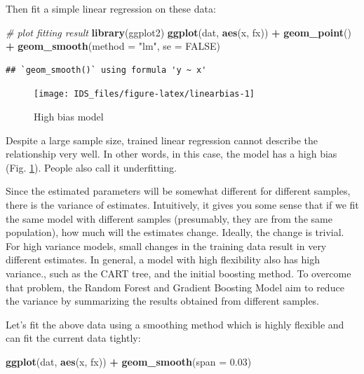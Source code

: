 \documentclass[12pt,]{krantz}
\makeatletter
\newenvironment{Shaded}{\begin{snugshade}}{\end{snugshade}}
\newcommand{\CommentTok}[1]{\textcolor[rgb]{0.37,0.37,0.37}{\textit{#1}}}
\newcommand{\DataTypeTok}[1]{\textcolor[rgb]{0.27,0.27,0.27}{#1}}
\newcommand{\FloatTok}[1]{\textcolor[rgb]{0.06,0.06,0.06}{#1}}
\newcommand{\KeywordTok}[1]{\textcolor[rgb]{0.27,0.27,0.27}{\textbf{#1}}}
\newcommand{\NormalTok}[1]{#1}
\newcommand{\OperatorTok}[1]{\textcolor[rgb]{0.43,0.43,0.43}{\textbf{#1}}}
\newcommand{\OtherTok}[1]{\textcolor[rgb]{0.37,0.37,0.37}{#1}}
\newcommand{\StringTok}[1]{\textcolor[rgb]{0.5,0.5,0.5}{#1}}
\newenvironment{kframe}{%
\medskip{}
\setlength{\fboxsep}{.8em}
 \def\at@end@of@kframe{}%
 \ifinner\ifhmode%
  \def\at@end@of@kframe{\end{minipage}}%
  \begin{minipage}{\columnwidth}%
 \fi\fi%
 \def\FrameCommand##1{\hskip\@totalleftmargin \hskip-\fboxsep
 \colorbox{shadecolor}{##1}\hskip-\fboxsep
     \hskip-\linewidth \hskip-\@totalleftmargin \hskip\columnwidth}%
 \MakeFramed {\advance\hsize-\width
   \@totalleftmargin\z@ \linewidth\hsize
   \@setminipage}}%
 {\par\unskip\endMakeFramed%
 \at@end@of@kframe}
\renewenvironment{Shaded}{\begin{kframe}}{\end{kframe}}
\makeatother
\begin{document}
Then fit a simple linear regression on these data:

\begin{Shaded}
\begin{Highlighting}[]
\CommentTok{# plot fitting result}
\KeywordTok{library}\NormalTok{(ggplot2)}
\KeywordTok{ggplot}\NormalTok{(dat, }\KeywordTok{aes}\NormalTok{(x, fx)) }\OperatorTok{+}\StringTok{ }
\StringTok{    }\KeywordTok{geom_point}\NormalTok{() }\OperatorTok{+}\StringTok{ }
\StringTok{    }\KeywordTok{geom_smooth}\NormalTok{(}\DataTypeTok{method =} \StringTok{"lm"}\NormalTok{, }\DataTypeTok{se =} \OtherTok{FALSE}\NormalTok{)}
\end{Highlighting}
\end{Shaded}

\begin{verbatim}
## `geom_smooth()` using formula 'y ~ x'
\end{verbatim}

\begin{figure}

{\centering \texttt{[image: IDS\_files/figure-latex/linearbias-1]} 

}

\caption{High bias model}\label{fig:linearbias}
\end{figure}

Despite a large sample size, trained linear regression cannot describe the relationship very well. In other words, in this case, the model has a high bias (Fig. \ref{fig:linearbias}). People also call it underfitting.

Since the estimated parameters will be somewhat different for different samples, there is the variance of estimates. Intuitively, it gives you some sense that if we fit the same model with different samples (presumably, they are from the same population), how much will the estimates change. Ideally, the change is trivial. For high variance models, small changes in the training data result in very different estimates. In general, a model with high flexibility also has high variance., such as the CART tree, and the initial boosting method. To overcome that problem, the Random Forest and Gradient Boosting Model aim to reduce the variance by summarizing the results obtained from different samples.

Let's fit the above data using a smoothing method which is highly flexible and can fit the current data tightly:

\begin{Shaded}
\begin{Highlighting}[]
\KeywordTok{ggplot}\NormalTok{(dat, }\KeywordTok{aes}\NormalTok{(x, fx)) }\OperatorTok{+}\StringTok{ }\KeywordTok{geom_smooth}\NormalTok{(}\DataTypeTok{span =} \FloatTok{0.03}\NormalTok{)}
\end{Highlighting}
\end{Shaded}
\end{document}
